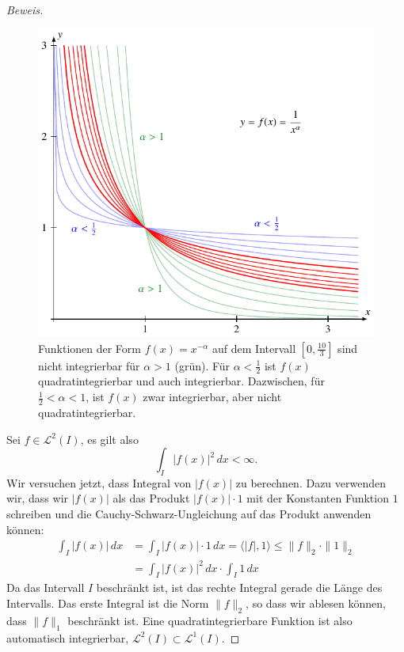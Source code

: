 \begin{proof}[Beweis]
\begin{figure}
\centering
\includegraphics{chapters/2-fourier/images/intfun.pdf}
\caption{Funktionen der Form $f(x)=x^{-\alpha}$ auf dem Intervall
$[0,\frac{10}{3}]$ sind nicht integrierbar für $\alpha > 1$ (grün).
Für $\alpha <\frac12$ ist $f(x)$ quadratintegrierbar und auch integrierbar.
Dazwischen, für $\frac12 <\alpha < 1$, ist $f(x)$ zwar integrierbar, aber
nicht quadratintegrierbar.
\label{fourier:intfun}}
\end{figure}
Sei $f\in\mathcal{L}^2(I)$, es gilt also
\[
\int_I |f(x)|^2\,dx < \infty.
\]
Wir versuchen jetzt, dass Integral von $|f(x)|$ zu berechnen.
Dazu verwenden wir, dass wir $|f(x)|$ als das Produkt
$|f(x)|\cdot 1$ mit der Konstanten Funktion $1$ schreiben
und die Cauchy-Schwarz-Ungleichung auf das Produkt anwenden können:
\begin{align*}
\int_I |f(x)|\,dx
&=
\int_I |f(x)| \cdot 1 \,dx
=
\langle |f|, 1\rangle
\le
\|f\|_2 \cdot \| 1 \|_2
\\
&=
\int_I |f(x)|^2\,dx \cdot \int_I 1\,dx
\end{align*}
Da das Intervall $I$ beschränkt ist, ist das rechte Integral gerade die
Länge des Intervalls.
Das erste Integral ist die Norm $\|f\|_2$, so dass wir ablesen können,
dass $\|f\|_1$ beschränkt ist.
Eine quadratintegrierbare Funktion ist also automatisch integrierbar,
$\mathcal{L}^2(I)\subset \mathcal{L}^1(I)$.


\end{proof}
